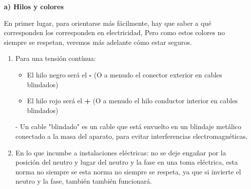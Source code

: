 \documentclass[a5paper,twoside,openany]{book}
\newenvironment{normalize}{\leftskip-\leftmargin}{\par}
\begin{document}
\begin{large}
\textbf{a) Hilos y colores}\\
\end{large}
En primer lugar, para orientarse más fácilmente, hay que saber a qué corresponden los
corresponden en electricidad,
Pero como estos colores no siempre se respetan, veremos más adelante cómo estar seguros.
\begin{enumerate}
\item Para una tensión contínua:
\begin{itemize}
\item El hilo negro será el \textbf{-} (O a menudo el conector exterior en cables blindados)
\item El hilo rojo será el \textbf{+} (O a menudo el hilo conductor interior en cables blindados)
\end{itemize}


\begin{normalize}
Un cable "blindado" es un cable que está envuelto en un blindaje metálico conectado a la masa del aparato, para evitar interferencias electromagnéticas.
\end{normalize}

\item En lo que incumbe a instalaciones eléctricas: no se deje engañar por la posición del neutro y lugar del neutro y la fase en una toma eléctrica, esta norma no siempre se
esta norma no siempre se respeta, ya que si invierte el neutro y la fase, también
también funcionará.


\end{enumerate}
\end{document}
